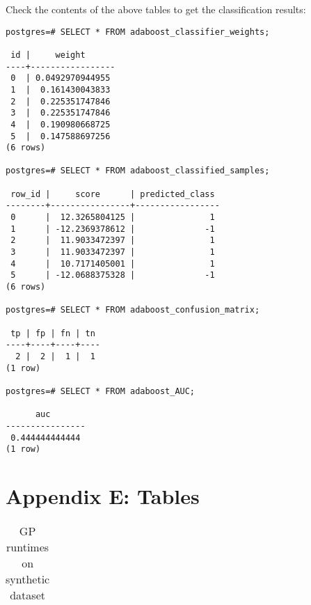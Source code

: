 {\raggedleft Check the contents of the above tables to get the classification results:}

\begin{verbatim}
postgres=# SELECT * FROM adaboost_classifier_weights;

 id |     weight      
----+-----------------
 0  | 0.0492970944955
 1  |  0.161430043833
 2  |  0.225351747846
 3  |  0.225351747846
 4  |  0.190980668725
 5  |  0.147588697256
(6 rows)

postgres=# SELECT * FROM adaboost_classified_samples;

 row_id |     score      | predicted_class 
--------+----------------+-----------------
 0      |  12.3265804125 |               1
 1      | -12.2369378612 |              -1
 2      |  11.9033472397 |               1
 3      |  11.9033472397 |               1
 4      |  10.7171405001 |               1
 5      | -12.0688375328 |              -1
(6 rows)

postgres=# SELECT * FROM adaboost_confusion_matrix;

 tp | fp | fn | tn 
----+----+----+----
  2 |  2 |  1 |  1
(1 row)

postgres=# SELECT * FROM adaboost_AUC;

      auc       
----------------
 0.444444444444
(1 row)

\end{verbatim}



\section*{Appendix E: Tables}

\begin{table}[!htbp]
\centering
\begin{tabular}{lcc}
\end{tabular}
\caption{GP runtimes on synthetic dataset}
\label{tab:gp}
\end{table}

